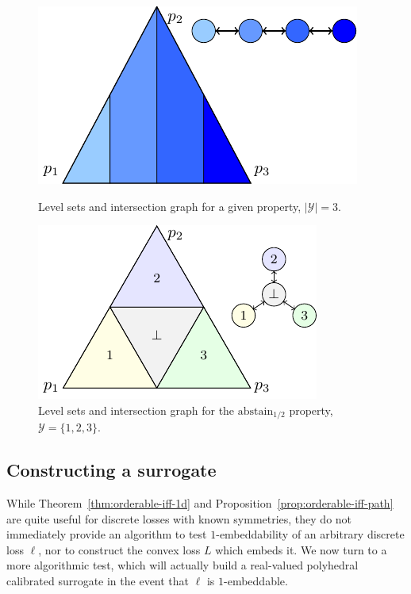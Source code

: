 \documentclass[anon]{colt2020} %
\newcommand{\reals}{\mathbb{R}}
\newcommand{\nonnegreals}{\reals_{\geq 0}}%
\newcommand{\abstain}[1]{\mathrm{abstain}_{#1}}
\newcommand{\R}{\mathcal{R}}
\newcommand{\Y}{\mathcal{Y}}
\begin{document}
\begin{figure}
	\begin{minipage}{0.48\linewidth}
	\centering
	\includegraphics[width = 0.6\linewidth]{tikz/intersection-graph.pdf}
	\caption{Level sets and intersection graph for a given property, $|\Y| = 3$.}
	\label{fig:intersection-graph-ex}
	\end{minipage}
\hfill
	\begin{minipage}{0.48\linewidth}
	\centering
	\includegraphics[width = 0.6\linewidth]{tikz/abstain-alpha-half.pdf}
	\caption{Level sets and intersection graph for the $\abstain{1/2}$ property, $\Y = \{1,2,3\}$.}
	\label{fig:abstain-alpha-half}
\end{minipage}
\end{figure}

\subsection{Constructing a surrogate}
While Theorem~\ref{thm:orderable-iff-1d} and Proposition~\ref{prop:orderable-iff-path} are quite useful for discrete losses with known symmetries, they do not immediately provide an algorithm to test $1$-embeddability of an arbitrary discrete loss $\ell$, nor to construct the convex loss $L$ which embeds it.
We now turn to a more algorithmic test, which will actually build a real-valued polyhedral calibrated surrogate in the event that $\ell$ is $1$-embeddable.

\end{document}
